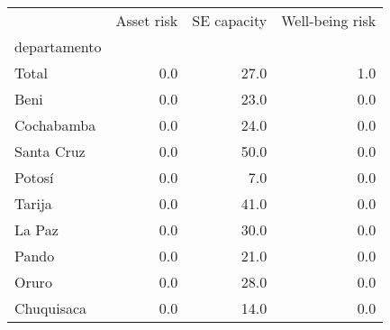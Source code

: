 \begin{tabular}{lrrr}
\toprule
{} &  Asset risk &  SE capacity &  Well-being risk \\
departamento &             &              &                  \\
\midrule
Total        &         0.0 &         27.0 &              1.0 \\
Beni         &         0.0 &         23.0 &              0.0 \\
Cochabamba   &         0.0 &         24.0 &              0.0 \\
Santa Cruz   &         0.0 &         50.0 &              0.0 \\
Potosí       &         0.0 &          7.0 &              0.0 \\
Tarija       &         0.0 &         41.0 &              0.0 \\
La Paz       &         0.0 &         30.0 &              0.0 \\
Pando        &         0.0 &         21.0 &              0.0 \\
Oruro        &         0.0 &         28.0 &              0.0 \\
Chuquisaca   &         0.0 &         14.0 &              0.0 \\
\bottomrule
\end{tabular}
